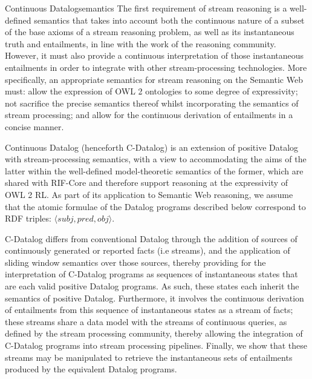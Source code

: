\begin{nestedsection}{Continuous Datalog}{semantics}
The first requirement of stream reasoning is a well-defined semantics
that takes into account both the continuous nature of a subset of the
base axioms of a stream reasoning problem, as well as its
instantaneous truth and entailments, in line with the work of the
reasoning community.  However, it must also provide a continuous
interpretation of those instantaneous entailments in order to
integrate with other stream-processing technologies.  More
specifically, an appropriate semantics for stream reasoning on the
Semantic Web must: allow the expression of OWL 2 ontologies to some
degree of expressivity; not sacrifice the precise semantics thereof
whilst incorporating the semantics of stream processing; and allow for
the continuous derivation of entailments in a concise manner.

Continuous Datalog (henceforth C-Datalog) is an extension of positive
Datalog with stream-processing semantics, with a view to accommodating
the aims of the latter within the well-defined model-theoretic
semantics of the former, which are shared with RIF-Core
\cite{w3crifbld} and therefore support reasoning at the expressivity
of OWL 2 RL. As part of its application to Semantic Web reasoning, we
assume that the atomic formulae of the Datalog programs described
below correspond to RDF triples: $\langle subj, pred, obj\rangle$.

C-Datalog differs from conventional Datalog through the addition of
sources of continuously generated or reported facts (i.e streams), and
the application of sliding window semantics over those sources,
thereby providing for the interpretation of C-Datalog programs as
sequences of instantaneous states that are each valid positive Datalog
programs.  As such, these states each inherit the semantics of
positive Datalog.  Furthermore, it involves the continuous derivation
of entailments from this sequence of instantaneous states as a stream
of facts; these streams share a data model with the streams of
continuous queries, as defined by the stream processing community,
thereby allowing the integration of C-Datalog programs into stream
processing pipelines. Finally, we show that these streams may be
manipulated to retrieve the instantaneous sets of entailments produced
by the equivalent Datalog programs.

\begin{definition}[Datalog]


\end{definition}
\end{nestedsection}
